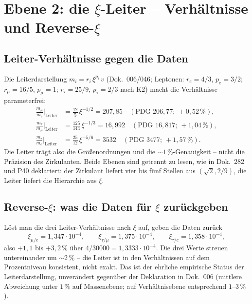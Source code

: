 \section{Ebene 2: die $\xi$-Leiter -- Verhältnisse und Reverse-$\xi$}

\subsection{Leiter-Verhältnisse gegen die Daten}
Die Leiterdarstellung $m_i = r_i\,\xi^{p_i}\,v$ (Dok.~006/046; Leptonen:
$r_e=4/3$, $p_e=3/2$; $r_\mu=16/5$, $p_\mu=1$; $r_\tau=25/9$, $p_\tau=2/3$
nach K2) macht die Verhältnisse parameterfrei:
\begin{align}
  \frac{m_\mu}{m_e}\Big|_{\text{Leiter}} &= \tfrac{12}{5}\,\xi^{-1/2} = 207{,}85
  \quad(\text{PDG } 206{,}77;\ +0{,}52\,\%),\\
  \frac{m_\tau}{m_\mu}\Big|_{\text{Leiter}} &= \tfrac{125}{144}\,\xi^{-1/3} = 16{,}992
  \quad(\text{PDG } 16{,}817;\ +1{,}04\,\%),\\
  \frac{m_\tau}{m_e}\Big|_{\text{Leiter}} &= \tfrac{25}{12}\,\xi^{-5/6} = 3532
  \quad(\text{PDG } 3477;\ +1{,}57\,\%).
\end{align}
Die Leiter trägt also die Größenordnungen und die $\sim1\,\%$-Genauigkeit --
nicht die Präzision des Zirkulanten. Beide Ebenen sind getrennt zu lesen, wie
in Dok.~282 und P40 deklariert: der Zirkulant liefert vier bis fünf Stellen
aus $(\sqrt2, 2/9)$, die Leiter liefert die Hierarchie aus $\xi$.

\subsection{Reverse-$\xi$: was die Daten für $\xi$ zurückgeben}
Löst man die drei Leiter-Verhältnisse nach $\xi$ auf, geben die Daten zurück
\begin{equation}
  \xi_{\mu/e} = 1{,}347\cdot10^{-4},\qquad
  \xi_{\tau/\mu} = 1{,}375\cdot10^{-4},\qquad
  \xi_{\tau/e} = 1{,}358\cdot10^{-4},
\end{equation}
also $+1{,}1$ bis $+3{,}2\,\%$ über $4/30000=1{,}3333\cdot10^{-4}$. Die drei
Werte streuen untereinander um $\sim2\,\%$ -- die Leiter ist in den
Verhältnissen auf dem Prozentniveau konsistent, nicht exakt. Das ist der
ehrliche empirische Status der Leiterdarstellung, unverändert gegenüber der
Deklaration in Dok.~006 (mittlere Abweichung unter $1\,\%$ auf
Massenebene; auf Verhältnisebene entsprechend $1$--$3\,\%$).

